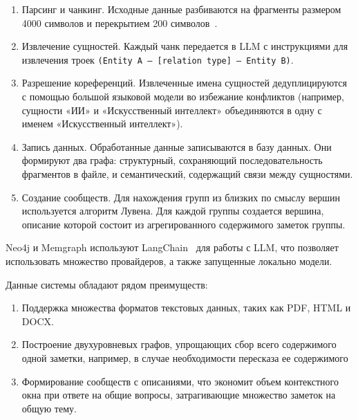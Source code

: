 \begin{enumerate}
      \item Парсинг и чанкинг. Исходные данные разбиваются на фрагменты размером
            4000 символов и перекрытием 200 символов~\cite{neo4j_graph_builder}.
      \item Извлечение сущностей. Каждый чанк передается в LLM с инструкциями для извлечения
            троек \texttt{(Entity A — [relation type] — Entity B)}.
      \item Разрешение кореференций. Извлеченные имена сущностей
            дедуплицируются с помощью большой языковой модели
            во избежание конфликтов
            (например, сущности «ИИ» и «Искусственный интеллект» объединяются в одну с именем
            «Искусственный интеллект»).
      \item Запись данных. Обработанные данные записываются в базу данных.
            Они формируют два графа:
            структурный, сохраняющий последовательность фрагментов в файле, и семантический,
            содержащий связи между сущностями.
      \item Создание сообществ. Для нахождения групп из близких по смыслу вершин
            используется алгоритм Лувена.
            Для каждой группы создается вершина, описание которой
            состоит из агрегированного содержимого заметок группы.
\end{enumerate}

Neo4j и Memgraph используют LangChain~\cite{Chase_langchain} для работы с LLM,
что позволяет использовать множество провайдеров,
а также запущенные локально модели.

Данные системы обладают рядом преимуществ:
\begin{enumerate}
      \item Поддержка множества форматов текстовых данных,
            таких как PDF, HTML и DOCX.
      \item Построение двухуровневых графов, упрощающих
            сбор всего содержимого одной заметки, например,
            в случае необходимости пересказа ее содержимого
      \item Формирование сообществ с описаниями,
            что экономит объем контекстного окна при ответе на общие вопросы,
            затрагивающие множество заметок на общую тему.
\end{enumerate}

